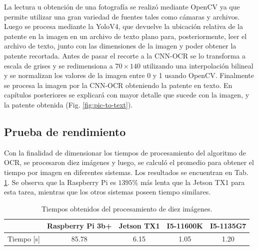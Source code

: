 La lectura u obtención de una fotografía se realizó mediante OpenCV \cite{opencv_opencv_2023} ya que permite utilizar una gran variedad de fuentes tales como cámaras y archivos. Luego se procesa mediante la YoloV4, que devuelve la ubicación relativa de la patente en la imagen en un archivo de texto plano para, posteriormente, leer el archivo de texto, junto con las dimensiones de la imagen y poder obtener la patente recortada. Antes de pasar el recorte a la CNN-OCR se lo transforma a escala de grises y se redimensiona a $70 \times 140$ utilizando una interpolación bilineal y se normalizan los valores de la imagen entre 0 y 1 usando OpenCV. Finalmente se procesa la imagen por la CNN-OCR obteniendo la patente en texto. En capítulos posteriores se explicará con mayor detalle que sucede con la imagen, y la patente obtenida (Fig. \ref{fig:pic-to-text}).


\subsection{Prueba de rendimiento}

Con la finalidad de dimensionar los tiempos de procesamiento del algoritmo de OCR, se procesaron diez imágenes y luego, se calculó el promedio para obtener el tiempo por imagen en diferentes sistemas. Los resultados se encuentran en Tab. \ref{tab:ocr}.
Se observa que la Raspberry Pi es $1395\%$ más lenta que la Jetson TX1 para esta tarea, mientras que los otros sistemas poseen tiempo similares.
\begin{table}
    \centering
    \begin{tabular}{ccccc}
        \toprule
                   & Raspberry Pi 3b+ & Jetson TX1 & I5-11600K & I5-1135G7 \\
        \midrule
        Tiempo [s] & 85.78            & 6.15       & 1.05      & 1.20      \\
        \bottomrule
    \end{tabular}
    \caption{Tiempos obtenidos del procesamiento de diez imágenes.}
    \label{tab:ocr}
\end{table}



